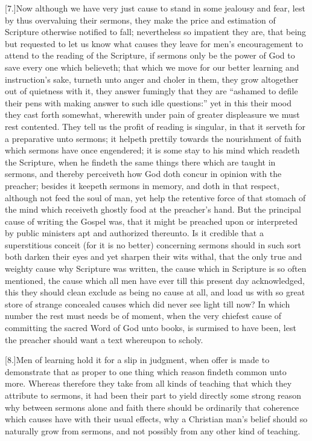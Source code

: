 [7.]Now although we have very just cause to stand in some jealousy and fear, lest by thus overvaluing their sermons, they make the price and estimation of Scripture otherwise notified to fall; nevertheless so impatient they are, that being but requested to let us know what causes they leave for men’s encouragement to attend to the reading of the Scripture, if sermons only be the power of God to save every one which believeth; that which we move for our better learning and instruction’s sake, turneth unto anger and choler in them, they grow altogether out of quietness with it, they answer fumingly that they are “ashamed to defile their pens with making answer to such idle questions:” yet in this their mood they cast forth somewhat, wherewith under pain of greater displeasure we must rest contented. They tell us the profit of reading is singular, in that it serveth for a preparative unto sermons; it helpeth prettily towards the nourishment of faith which sermons have once engendered; it is some stay to his mind which readeth the Scripture, when he findeth the same things there which are taught in sermons, and thereby perceiveth how God doth concur in opinion with the preacher; besides it keepeth sermons in memory, and doth in that respect, although not feed the soul of man, yet help the retentive force of that stomach of the mind which receiveth ghostly  food at the preacher’s hand.
 But the principal cause of writing the Gospel was, that it might be preached upon or interpreted by public ministers apt and authorized thereunto. Is it credible that a superstitious conceit (for it is no better) concerning sermons should in such sort both darken their eyes and yet sharpen their wits withal, that the only true and weighty cause why Scripture was written, the cause which in Scripture is so often mentioned, the cause which all men have ever till this present day acknowledged, this they should clean exclude as being no cause at all, and load us with so great store of strange concealed causes which did never see light till now? In which number the rest must needs be of moment, when the very chiefest cause of committing the sacred Word of God unto books, is surmised to have been, lest the preacher should want a text whereupon to scholy.

[8.]Men of learning hold it for a slip in judgment, when offer is made to demonstrate that as proper to one thing which reason findeth common unto more. Whereas therefore they take from all kinds of teaching that which they attribute to sermons, it had been their part to yield directly some strong reason why between sermons alone and faith there should be ordinarily that coherence which causes have with their usual effects, why a Christian man’s belief should so naturally grow from sermons, and not possibly from any other kind of teaching.

